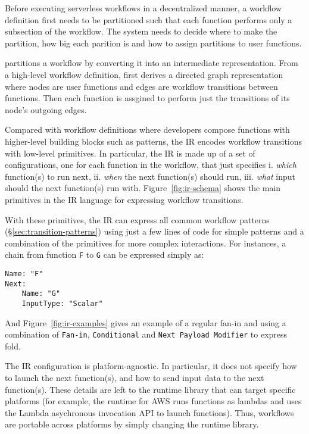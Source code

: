 Before executing serverless workflows in a decentralized manner, a workflow
definition first needs to be partitioned such that each function performs only
a subsection of the workflow. The system needs to decide where to make the
partition, how big each parition is and how to assign partitions to user
functions.

\name{} partitions a workflow by converting it into an intermediate
representation. From a high-level workflow definition, \name{} first derives a
directed graph representation where nodes are user functions and edges are
workflow transitions between functions. Then each function is assgined to
perform just the transitions of its node's outgoing edges.

Compared with workflow definitions where developers compose functions with
higher-level building blocks such as patterns, the \name{} IR encodes workflow
transitions with low-level primitives. In particular, the IR is made up of a
set of configurations, one for each function in the workflow, that just
specifies i. \textit{which} function(s) to run next, ii. \textit{when} the
next function(s) should run, iii. \textit{what} input should the next
function(s) run with. Figure~\ref{fig:ir-schema} shows the main primitives in
the \name{} IR language for expressing workflow transitions.

With these primitives, the IR can express all common workflow patterns
(\S\ref{sec:transition-patterns}) using just a few lines of code for simple
patterns and a combination of the primitives for more complex interactions.
For instances, a chain from function \texttt{F} to \texttt{G} can be expressed
simply as:
\begin{verbatim}
Name: "F"
Next:
    Name: "G"
    InputType: "Scalar"
\end{verbatim}

And Figure~\ref{fig:ir-examples} gives an example of a regular fan-in and
using a combination of \texttt{Fan-in}, \texttt{Conditional} and \texttt{Next
Payload Modifier} to express fold.

The IR configuration is platform-agnostic. In particular, it does not specify
how to launch the next function(s), and how to send input data to the next
function(s). These details are left to the \name{} runtime library that can
target specific platforms (for example, the runtime for AWS runs functions as
lambdas and uses the Lambda asychronous invocation API to launch functions).
Thus, workflows are portable across platforms by simply changing the runtime
library.

